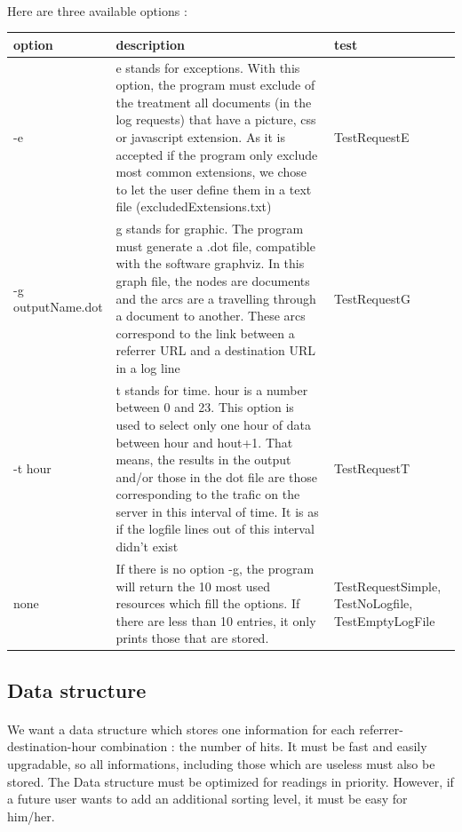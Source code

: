 \documentclass[a4paper, 12pts]{article}
\begin{document}
\paragraph{} 
 Here are three available options :
\begin{center}
   \begin{tabular}{| p{1cm} | p{9.5cm} | p{3cm} |}
	\hline
	option & description & test\\ \hline
	-e & e stands for exceptions. With this option, the program must exclude of the treatment all documents (in the log requests) that have a picture, css or javascript extension. As it is accepted if the program only exclude most common extensions, we chose to let the user define them in a text file (excludedExtensions.txt) & TestRequestE\\ \hline
	-g outputName.dot & g stands for graphic. The program must generate a .dot file, compatible with the software graphviz. In this graph file, the nodes are documents and the arcs are a travelling through a document to another. These arcs correspond to the link between a referrer URL and a destination URL in a log line & TestRequestG\\ \hline
	-t hour & t stands for time. hour is a number between 0 and 23. This option is used to select only one hour of data between hour and hout+1. That means, the results in the output and/or those in the dot file are those corresponding to the trafic on the server in this interval of time. It is as if the logfile lines out of this interval didn't exist & TestRequestT\\ \hline
	none & If there is no option -g, the program will return the 10 most used resources which fill the options. If there are less than 10 entries, it only prints those that are stored. & TestRequestSimple, TestNoLogfile, TestEmptyLogFile\\ \hline
   \end{tabular}
\end{center}

\subsection{Data structure}
\paragraph{}
 We want a data structure which stores one information for each referrer-destination-hour combination : the number of hits. It must be fast and easily upgradable, so all informations, including those which are useless must also be stored.
 The Data structure must be optimized for readings in priority. However, if a future user wants to add an additional sorting level, it must be easy for him/her.
 
\end{document}
